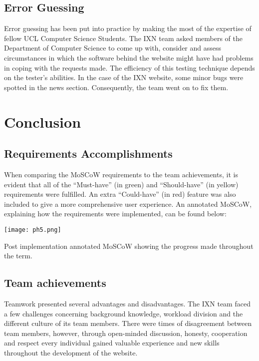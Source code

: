 \documentclass[fontsize=11pt]{extarticle}
\numberwithin{figure}{section} %
\numberwithin{table}{section}%
\begin{document}
\hypertarget{error-guessing}{%
\subsection{Error Guessing}\label{error-guessing}}

Error guessing has been put into practice by making the most of the
expertise of fellow UCL Computer Science Students. The IXN team asked
members of the Department of Computer Science to come up with, consider
and assess circumstances in which the software behind the website might
have had problems in coping with the requests made. The efficiency of
this testing technique depends on the tester's abilities. In the case of
the IXN website, some minor bugs were spotted in the news section.
Consequently, the team went on to fix them.

\newpage

\hypertarget{conclusion}{%
\section{Conclusion}\label{conclusion}}

\hypertarget{requirements-accomplishments}{%
\subsection{Requirements
Accomplishments}\label{requirements-accomplishments}}

When comparing the MoSCoW requirements to the team achievements, it is
evident that all of the ``Must-have'' (in green) and ``Should-have'' (in
yellow) requirements were fulfilled. An extra ``Could-have'' (in red)
feature was also included to give a more comprehensive user experience.
An annotated MoSCoW, explaining how the requirements were implemented,
can be found below:

\begin{table}[H]
      \centering
      \texttt{[image: ph5.png]}
      \caption{Post implementation annotated MoSCoW showing the progress made throughout the term.}
 \end{table}

\hypertarget{team-achievements}{%
\subsection{Team achievements}\label{team-achievements}}

Teamwork presented several advantages and disadvantages. The IXN team
faced a few challenges concerning background knowledge, workload
division and the different culture of its team members. There were times
of disagreement between team members, however, through open-minded
discussion, honesty, cooperation and respect every individual gained
valuable experience and new skills throughout the development of the
website.
\end{document}
